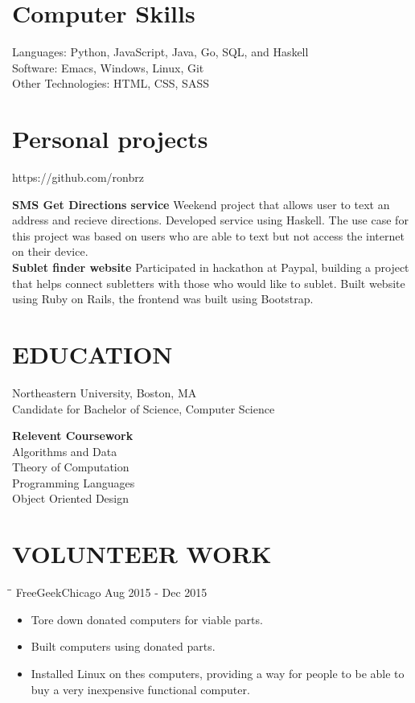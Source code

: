 \documentclass{res}
\begin{document}
\begin{resume}
\section{Computer Skills}
Languages:  Python, JavaScript, Java, Go, SQL, and Haskell \\
Software: Emacs, Windows, Linux, Git  \\
Other Technologies:  HTML, CSS,  SASS
\section{Personal projects}
        \centerline{https://github.com/ronbrz}\vspace{-.1in} 
        {\bf SMS Get Directions service} Weekend project that allows user to text an address
        and recieve directions. Developed service using Haskell. The use case for this project
        was based on users who are able to text but not access the internet on their device. \\
        {\bf Sublet finder website} Participated in hackathon at Paypal, building a project
        that helps connect subletters with those who would like to sublet. Built website using
        Ruby on Rails, the frontend was built using Bootstrap.

\section{EDUCATION}
Northeastern University, Boston, MA \\
Candidate for Bachelor of Science, Computer Science   \\
\begin{center} \vspace{-.3in}
  {\bf Relevent Coursework} \\
  Algorithms and Data \\
  Theory of Computation \\
  Programming Languages \\
  Object Oriented Design \\
\end{center}

\vspace{-.1in}
\section{VOLUNTEER WORK}
\vspace{-0.1in}
\begin{tabbing}
  \hspace{2.3in}\= \hspace{2.6in}\= \kill
  FreeGeekChicago \>\> Aug 2015 - Dec 2015
\end{tabbing}
\begin{itemize} \itemsep -2pt
\item Tore down donated computers for viable parts.
\item Built computers using donated parts.
  \item Installed Linux on thes computers, providing a way for people to be able to buy a very inexpensive functional computer.
\end{itemize}

\end{resume}
\end{document}
